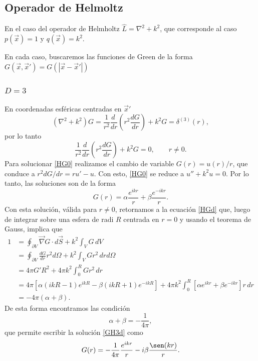 \subsection{Operador de Helmoltz}
En el caso del operador de Helmholtz $\hat{L}=\nabla^2+k^2$, que corresponde al caso $p(\vec{x})=1$ y $q(\vec{x})=k^2$.

En cada caso, buscaremos las funciones de Green de la forma $G(\vec{x},\vec{x}')=G(|\vec{x}-\vec{x}'|)$

\subsubsection{$D=3$}
En coordenadas esféricas centradas en $\vec{x}'$
\begin{equation}\label{HGd}
(\nabla^2+k^2)G=\frac{1}{r^2}\frac{d\ }{dr}\left(r^2\frac{dG}{dr}\right)+k^2G=\delta^{(3)}(r),
\end{equation}
por lo tanto 
\begin{equation}\label{HG0}
\frac{1}{r^2}\frac{d\ }{dr}\left(r^2\frac{dG}{dr}\right)+k^2G=0, \qquad r\neq 0.
\end{equation}
Para solucionar \eqref{HG0} realizamos el cambio de variable $G(r)=u(r)/r$, que conduce a $r^2dG/dr=ru'-u$. Con esto, \eqref{HG0} se reduce a $u''+k^2u=0$. Por lo tanto, las soluciones son de la forma
\begin{equation}\label{GH3d}
G(r)=\alpha\frac{e^{ikr}}{r}+\beta\frac{e^{-ikr}}{r}.
\end{equation}
Con esta solución, válida para $r\neq 0$, retornamos a la ecuación \eqref{HGd} que, luego de integrar sobre una esfera de radi $R$ centrada en $r=0$ y usando el teorema de Gauss, implica que
\begin{align}
1 &= \oint_{\partial V}\vec\nabla G\cdot d\vec{S}+k^2\int_VG\,dV \\
&= \oint_{\partial V}\frac{dG}{dr}r^2d\Omega+k^2\int_VGr^2\,drd\Omega \\
&= 4\pi G'R^2+4\pi k^2\int_0^R Gr^2\,dr \\
&= 4\pi\left[\alpha\left(ikR-1\right)e^{ikR}-\beta\left(ikR+1\right)e^{-ikR}\right]+4\pi k^2\int_0^R \left[\alpha e^{ikr}+\beta e^{-ikr}\right]r\,dr \\
&= -4\pi(\alpha+\beta).
\end{align}
De esta forma encontramos las condición
\begin{equation}
\alpha+\beta=-\frac{1}{4\pi},
\end{equation}
que permite escribir la solución \eqref{GH3d} como
\begin{equation}\label{GH3d2}
G(r)=-\frac{1}{4\pi}\frac{e^{ikr}}{r}-i\beta\frac{\sen(kr)}{r}.
\end{equation}
